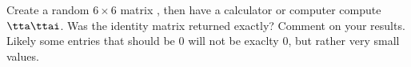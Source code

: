 {Create a random $6\times 6$ matrix \tta, then have a calculator or computer compute $\tta\ttai$. Was the identity matrix returned exactly? Comment on your results.}
{Likely some entries that should be 0 will not be exaclty 0, but rather very small values.}